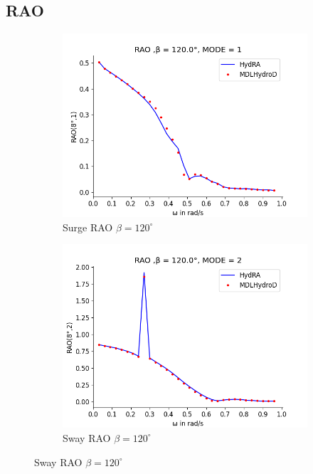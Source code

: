 \subsection{RAO}
\begin{figure}[H]
    \centering
    \begin{subfigure}[b]{0.49\textwidth}
        \includegraphics[width=\textwidth]{plots/kvlcc/rao/rao1.png}
        \caption{Surge RAO $\beta = 120^{\circ}$}
    \end{subfigure}
    \begin{subfigure}[b]{0.49\textwidth}
        \includegraphics[width=\textwidth]{plots/kvlcc/rao/rao2.png}
        \caption{Sway RAO $\beta = 120^{\circ}$}
    \end{subfigure}

\end{figure}
